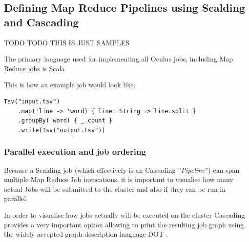 \subsection{Defining Map Reduce Pipelines using Scalding and Cascading}
TODO TODO THIS IS JUST SAMPLES

The primary language used for implementing all Oculus jobs, including Map Reduce jobs is Scala \cite{scala}

This is how an example job would look like:

\begin{lstlisting}[caption={Simplest Scalding job used in Oculus -- each frame perceptual hashing}, label={lst:simplest-scalding-job}]
  Tsv("input.tsv")
    .map('line -> 'word) { line: String => line.split }
    .groupBy('word) { _.count }
    .write(Tsv("output.tsv"))
\end{lstlisting}


\subsubsection{Parallel execution and job ordering}
Because a Scalding job (which effectively is an Cascading ''\textit{Pipeline}'') can span multiple Map Reduce Job invocations,
it is important to visualise how many actual Jobs will be submitted to the cluster and also if they can be run in parallel.

In order to visualise how jobs actually will be executed on the cluster Cascading provides a very important option allowing to print the resulting job
graph using the widely accepted graph-description language DOT \cite{dot}.

